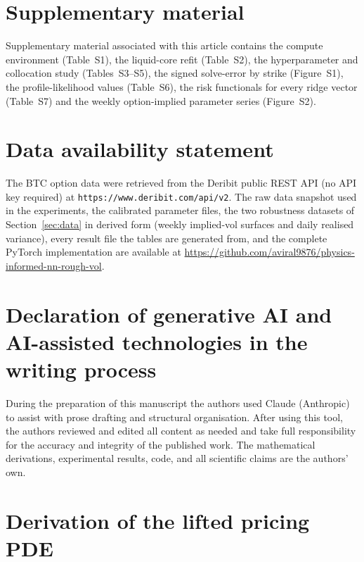 \documentclass[preprint,12pt]{elsarticle}
\begin{document}
\section*{Supplementary material}
Supplementary material associated with this article contains the compute
environment (Table~S1), the liquid-core refit (Table~S2), the hyperparameter and
collocation study (Tables~S3--S5), the signed solve-error by strike
(Figure~S1), the profile-likelihood values (Table~S6), the risk functionals for
every ridge vector (Table~S7) and the weekly option-implied parameter series
(Figure~S2).

\section*{Data availability statement}

The BTC option data were retrieved from the Deribit public REST API
(no API key required) at \texttt{https://www.deribit.com/api/v2}. The raw data
snapshot used in the experiments, the calibrated parameter files, the two
robustness datasets of Section~\ref{sec:data} in derived form (weekly implied-vol
surfaces and daily realised variance), every result file the tables are generated
from, and the complete PyTorch implementation are available at
\url{https://github.com/aviral9876/physics-informed-nn-rough-vol}.

\section*{Declaration of generative AI and AI-assisted technologies in the
writing process}

During the preparation of this manuscript the authors used Claude (Anthropic)
to assist with prose drafting and structural organisation. After using this
tool, the authors reviewed and edited all content as needed and take full
responsibility for the accuracy and integrity of the published work. The
mathematical derivations, experimental results, code, and all scientific claims
are the authors' own.

\appendix

\section{Derivation of the lifted pricing PDE}
\label{app:derivation}
\end{document}
